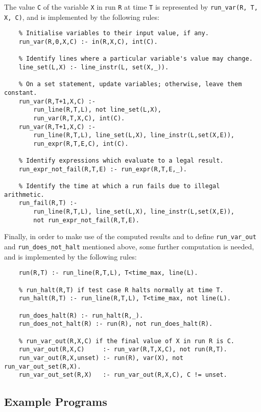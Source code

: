 \documentclass[a4paper,twoside,notitlepage]{report}
\begin{document}
The value \verb|C| of the variable \verb|X| in run \verb|R| at time 
\verb|T| is represented by \verb|run_var(R, T, X, C)|, and is implemented 
by the following rules:
\begin{Verbatim}
    % Initialise variables to their input value, if any.
    run_var(R,0,X,C) :- in(R,X,C), int(C).
    
    % Identify lines where a particular variable's value may change.
    line_set(L,X) :- line_instr(L, set(X,_)).
    
    % On a set statement, update variables; otherwise, leave them constant.
    run_var(R,T+1,X,C) :-
        run_line(R,T,L), not line_set(L,X),
        run_var(R,T,X,C), int(C).
    run_var(R,T+1,X,C) :-
        run_line(R,T,L), line_set(L,X), line_instr(L,set(X,E)),
        run_expr(R,T,E,C), int(C).
    
    % Identify expressions which evaluate to a legal result.
    run_expr_not_fail(R,T,E) :- run_expr(R,T,E,_).
    
    % Identify the time at which a run fails due to illegal arithmetic.
    run_fail(R,T) :-
        run_line(R,T,L), line_set(L,X), line_instr(L,set(X,E)),
        not run_expr_not_fail(R,T,E).
\end{Verbatim}

Finally, in order to make use of the computed results and to define 
\verb|run_var_out| and \verb|run_does_not_halt| mentioned above, some 
further computation is needed, and is implemented by the following rules:

\begin{Verbatim}[samepage=true]
    % run(R,T) if test case R runs to at least time T.
    run(R,T) :- run_line(R,T,L), T<time_max, line(L).
    
    % run_halt(R,T) if test case R halts normally at time T.
    run_halt(R,T) :- run_line(R,T,L), T<time_max, not line(L).
    
    run_does_halt(R) :- run_halt(R,_).
    run_does_not_halt(R) :- run(R), not run_does_halt(R).
    
    % run_var_out(R,X,C) if the final value of X in run R is C.
    run_var_out(R,X,C)     :- run_var(R,T,X,C), not run(R,T).
    run_var_out(R,X,unset) :- run(R), var(X), not run_var_out_set(R,X).
    run_var_out_set(R,X)   :- run_var_out(R,X,C), C != unset.
\end{Verbatim}

\subsection{Example Programs}
\end{document}

